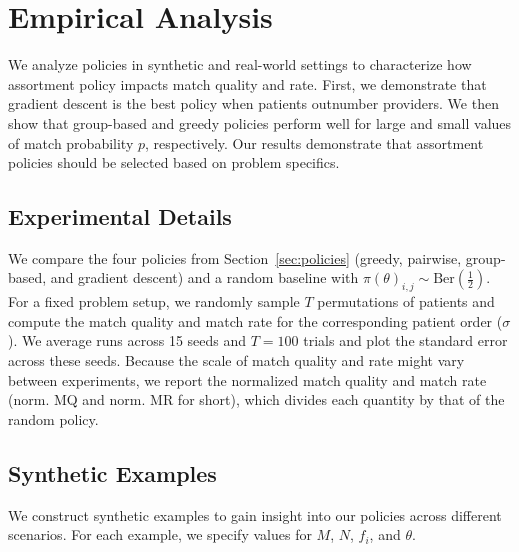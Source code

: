 \section{Empirical Analysis}
\label{sec:empirical}
We analyze policies in synthetic and real-world settings to characterize how assortment policy impacts match quality and rate. 
First, we demonstrate that gradient descent is the best policy when patients outnumber providers. 
We then show that group-based and greedy policies perform well for large and small values of match probability $p$, respectively.   
Our results demonstrate that assortment policies should be selected based on problem specifics. 

\subsection{Experimental Details}
We compare the four policies from Section~\ref{sec:policies} (greedy, pairwise, group-based, and gradient descent) and a random baseline with $\pi(\theta)_{i,j} \sim \text{Ber}(\frac{1}{2})$. 
For a fixed problem setup, we randomly sample $T$ permutations of patients and compute the match quality and match rate for the corresponding patient order ($\sigma$). We average runs across 15 seeds and $T=100$ trials and plot the standard error across these seeds. 
Because the scale of match quality and rate might vary between experiments, we report the normalized match quality and match rate (norm. MQ and norm. MR for short), which divides each quantity by that of the random policy.  

\subsection{Synthetic Examples}
\label{sec:synthetic}
We construct synthetic examples to gain insight into our policies across different scenarios. 
For each example, we specify values for $M$, $N$, $f_{i}$, and $\theta$. 

